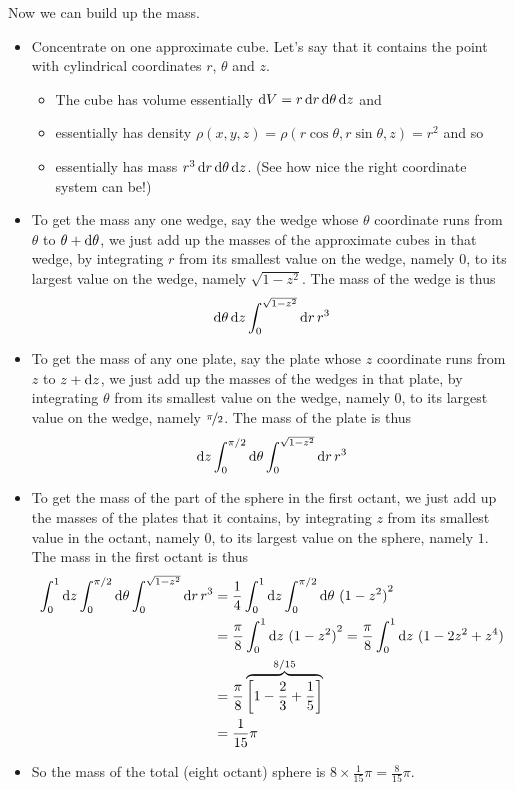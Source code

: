 \begin{eg}
Now we can build up the mass.
\begin{itemize}
\item
Concentrate on one approximate cube. Let's say that it contains the point 
with cylindrical coordinates $r$, $\theta$ and $z$.
\begin{itemize}
\item 
The cube has volume essentially $\mathrm{d}V=r\,\mathrm{d}r\,\mathrm{d}\theta\,\mathrm{d}z$
and
\item
essentially has density $\rho(x,y,z)=\rho(r\cos\theta,r\sin\theta,z) = r^2$ 
and so
\item 
essentially has mass $r^3\,\mathrm{d}r\,\mathrm{d}\theta\,\mathrm{d}z$.
(See how nice the right coordinate system can be!)
\end{itemize}

\item
To get the mass any one wedge, say the wedge whose $\theta$ coordinate runs 
from $\theta$ to $\theta+\mathrm{d}\theta$, we just add up the masses of 
the approximate cubes in that wedge, by integrating $r$ from its smallest 
value on the wedge, namely $0$, to its largest value on the wedge, namely 
$\sqrt{1-z^2}$. The mass of the wedge is thus
\begin{align*}
\mathrm{d}\theta\,\mathrm{d}z \int_0^{\sqrt{1-z^2}}  \mathrm{d}r\,r^3
\end{align*}

\item
To get the mass of any one plate, say the plate whose $z$ coordinate runs 
from $z$ to $z+\mathrm{d}z$, we just add up the masses of the wedges 
in that plate, by integrating $\theta$ from its smallest value on 
the wedge, namely $0$, to its largest value on the wedge, namely 
$\nicefrac{\pi}{2}$. The mass of the plate is thus
\begin{align*}
\mathrm{d}z\int_0^{\pi/2}\mathrm{d}\theta\int_0^{\sqrt{1-z^2}}  \mathrm{d}r\,r^3
\end{align*}

\item
To get the mass of the part of the sphere in the first octant, we just 
add up the masses of the plates that it contains, by integrating $z$ from its smallest value in the octant, namely $0$, to its largest value on the sphere, 
namely  $1$. The mass in the first octant is thus
\begin{align*}
\int_0^1\mathrm{d}z\int_0^{\pi/2}\mathrm{d}\theta\int_0^{\sqrt{1-z^2}}  \mathrm{d}r\,r^3
&= \frac{1}{4}\int_0^1\mathrm{d}z\int_0^{\pi/2}\mathrm{d}\theta\ {(1-z^2)}^2 \\
&= \frac{\pi}{8}\int_0^1\mathrm{d}z\ {(1-z^2)}^2 
 =\frac{\pi}{8}\int_0^1\mathrm{d}z\ (1-2z^2+z^4)  \\
&= \frac{\pi}{8}\overbrace{\left[1-\frac{2}{3}+\frac{1}{5}\right]}^{8/15} \\
&=\frac{1}{15}\pi
\end{align*}
\item
So the mass of the total (eight octant) sphere is $8\times\frac{1}{15}\pi=\frac{8}{15}\pi$.
\end{itemize}


\end{eg}
